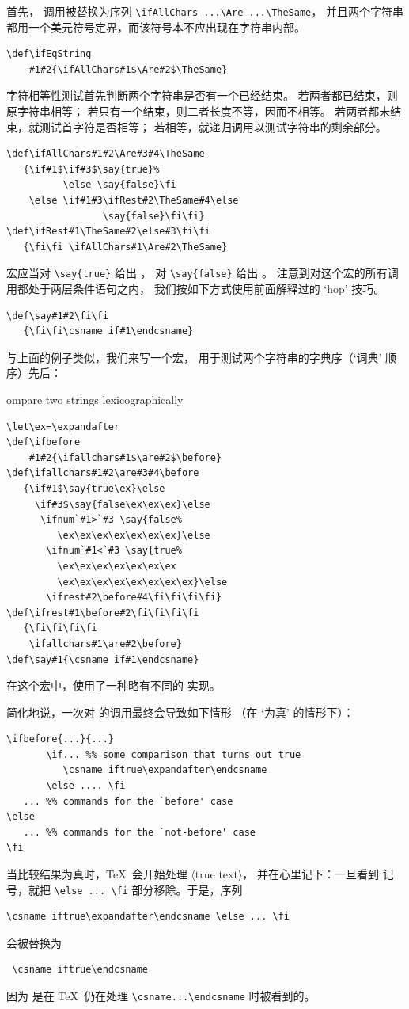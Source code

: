 \documentclass[a4paper]{rapport3}
\def\gr#1{$\langle$#1$\rangle$}\def\key#1{{\tt#1}}
\def\howto#1\par{}
\begin{document}
首先， 调用被替换为序列
\verb>\ifAllChars ...\Are ...\TheSame>，
并且两个字符串都用一个美元符号定界，而该符号本不应出现在字符串内部。
\begin{verbatim}
\def\ifEqString
    #1#2{\ifAllChars#1$\Are#2$\TheSame}
\end{verbatim}
字符相等性测试首先判断两个字符串是否有一个已经结束。
若两者都已结束，则原字符串相等；
若只有一个结束，则二者长度不等，因而不相等。
若两者都未结束，就测试首字符是否相等；
若相等，就递归调用以测试字符串的剩余部分。
\begin{verbatim}
\def\ifAllChars#1#2\Are#3#4\TheSame
   {\if#1$\if#3$\say{true}%
          \else \say{false}\fi
    \else \if#1#3\ifRest#2\TheSame#4\else
                 \say{false}\fi\fi}
\def\ifRest#1\TheSame#2\else#3\fi\fi
   {\fi\fi \ifAllChars#1\Are#2\TheSame}
\end{verbatim}
 宏应当对 \verb>\say{true}> 给出 ，
对 \verb>\say{false}> 给出 。
注意到对这个宏的所有调用都处于两层条件语句之内，
我们按如下方式使用前面解释过的 `hop' 技巧。
\begin{verbatim}
\def\say#1#2\fi\fi
   {\fi\fi\csname if#1\endcsname}
\end{verbatim}

与上面的例子类似，我们来写一个宏，
用于测试两个字符串的字典序（`词典' 顺序）先后：
\howto Compare two strings lexicographically\par
\begin{verbatim}
\let\ex=\expandafter
\def\ifbefore
    #1#2{\ifallchars#1$\are#2$\before}
\def\ifallchars#1#2\are#3#4\before
   {\if#1$\say{true\ex}\else
     \if#3$\say{false\ex\ex\ex}\else
      \ifnum`#1>`#3 \say{false%
         \ex\ex\ex\ex\ex\ex\ex}\else
       \ifnum`#1<`#3 \say{true%
         \ex\ex\ex\ex\ex\ex\ex
         \ex\ex\ex\ex\ex\ex\ex\ex}\else
       \ifrest#2\before#4\fi\fi\fi\fi}
\def\ifrest#1\before#2\fi\fi\fi\fi
   {\fi\fi\fi\fi
    \ifallchars#1\are#2\before}
\def\say#1{\csname if#1\endcsname}
\end{verbatim}
在这个宏中，使用了一种略有不同的  实现。

简化地说，一次对  的调用最终会导致如下情形
（在 `为真' 的情形下）：
\begin{verbatim}
\ifbefore{...}{...}
       \if... %% some comparison that turns out true
          \csname iftrue\expandafter\endcsname
       \else .... \fi
   ... %% commands for the `before' case
\else
   ... %% commands for the `not-before' case
\fi
\end{verbatim}
当比较结果为真时，\TeX\ 会开始处理 \gr{true text}，
并在心里记下：一旦看到  记号，就把
\verb>\else ... \fi> 部分移除。于是，序列
\begin{verbatim}
\csname iftrue\expandafter\endcsname \else ... \fi
\end{verbatim}
会被替换为\begin{verbatim}
 \csname iftrue\endcsname
\end{verbatim}
因为  是在 \TeX\ 仍在处理 \verb>\csname...\endcsname> 时被看到的。
\end{document}
